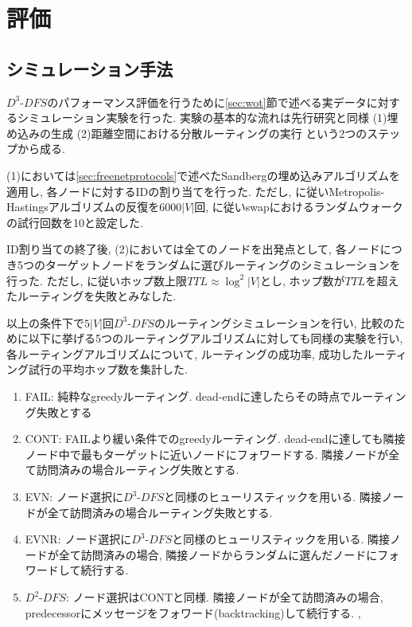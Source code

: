 \documentclass[dvipdfmx]{ampbt}
\begin{document}
\section{評価}
  \subsection{シミュレーション手法}
  $D^3$-$DFS$のパフォーマンス評価を行うために\ref{sec:wot}節で述べる実データに対するシミュレーション実験を行った. 実験の基本的な流れは先行研究と同様 (1)埋め込みの生成 (2)距離空間における分散ルーティングの実行 という2つのステップから成る.

  (1)においては\ref{sec:freenetprotocols}で述べたSandbergの埋め込みアルゴリズムを適用し, 各ノードに対するIDの割り当てを行った. ただし, \cite{sandberg2006distributed}に従いMetropolis-Hastingsアルゴリズムの反復を$6000|V|$回, \cite{roos2016analyzing}に従い\gls{swap}におけるランダムウォークの試行回数を10と設定した.

  ID割り当ての終了後, (2)においては全てのノードを出発点として, 各ノードにつき5つのターゲットノードをランダムに選びルーティングのシミュレーションを行った. ただし\cite{sandberg2006distributed}, \cite{schiller2011attack}に従いホップ数上限$TTL\approx \log^2|V|$とし, ホップ数が$TTL$を超えたルーティングを失敗とみなした.

  以上の条件下で$5|V|$回$D^3$-$DFS$のルーティングシミュレーションを行い, 比較のために以下に挙げる5つのルーティングアルゴリズムに対しても同様の実験を行い, 各ルーティングアルゴリズムについて, ルーティングの成功率, 成功したルーティング試行の平均ホップ数を集計した.

   \begin{enumerate}[label=(\alph*)]
    \item FAIL: 純粋なgreedyルーティング. dead-endに達したらその時点でルーティング失敗とする\cite{sandberg2006distributed}
    \item CONT: FAILより緩い条件でのgreedyルーティング. dead-endに達しても隣接ノード中で最もターゲットに近いノードにフォワードする. 隣接ノードが全て訪問済みの場合ルーティング失敗とする. \cite{sandberg2006distributed}
    \item EVN: ノード選択に$D^3$-$DFS$と同様のヒューリスティックを用いる. 隣接ノードが全て訪問済みの場合ルーティング失敗とする. 
    \item EVNR: ノード選択に$D^3$-$DFS$と同様のヒューリスティックを用いる. 隣接ノードが全て訪問済みの場合, 隣接ノードからランダムに選んだノードにフォワードして続行する. \cite{csimcsek2008navigating}
    \item $D^2$-$DFS$: ノード選択はCONTと同様. 隣接ノードが全て訪問済みの場合, predecessorにメッセージをフォワード(backtracking)して続行する. \cite{clarke2001freenet}, \cite{clarke2010private}
   \end{enumerate}
\end{document}
